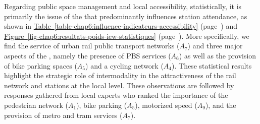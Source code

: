 \begin{refsegment}
Regarding public space management and local accessibility, statistically, it is primarily the issue of the  that predominantly influences station attendance, as shown in \hyperref[table-chap6:influence-indicateurs-accessibility]{Table~\ref{table-chap6:influence-indicateurs-accessibility}} (page~\pageref{table-chap6:influence-indicateurs-accessibility}) and \hyperref[fig-chap6:resultats-poids-iew-statistiques]{Figure~\ref{fig-chap6:resultats-poids-iew-statistiques}} (page~\pageref{fig-chap6:resultats-poids-iew-statistiques}). More specifically, we find the service of urban rail public transport networks (\(A_{7}\)) and three major aspects of the  \textcolor{blue}{\autocites[169]{heran_retour_2015}[]{heran_systeme_2001}}, namely the presence of \acrshort{PBS} services (\(A_{6}\)) as well as the provision of bike parking spaces (\(A_{5}\)) and a cycling network (\(A_{4}\)). These statistical results highlight the strategic role of \gls{intermodality} in the attractiveness of the rail network and stations at the local level. These observations are followed by responses gathered from local experts who ranked the importance of the pedestrian network (\(A_{1}\)), bike parking (\(A_{5}\)), motorized speed (\(A_{9}\)), and the provision of metro and tram services (\(A_{7}\)).%



\end{refsegment}
